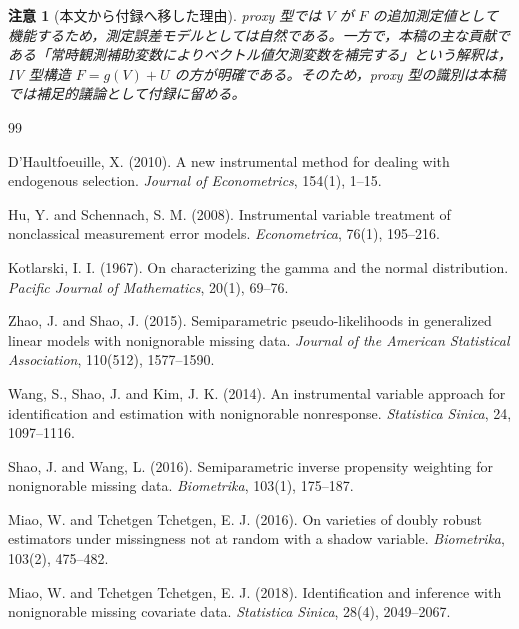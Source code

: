 \documentclass[10pt,a4paper]{article}
\newtheorem{remark}{注意}
\newcommand{\1}{\mathbf{1}}
\begin{document}
\begin{remark}[本文から付録へ移した理由]
proxy 型では $V$ が $F$ の追加測定値として機能するため，測定誤差モデルとしては自然である。一方で，本稿の主な貢献である「常時観測補助変数によりベクトル値欠測変数を補完する」という解釈は，IV 型構造 $F=g(V)+U$ の方が明確である。そのため，proxy 型の識別は本稿では補足的議論として付録に留める。
\end{remark}

\nocite{dHaultfoeuille2010,HuSchennach2008,Kotlarski1967,ZhaoShao2015,KanoTakai2011,WangShaoKim2014,ShaoWang2016,MiaoTchetgen2016,MiaoTchetgen2018,LiMiaoTchetgen2023,Rubin1976,Rubin1987,LittleRubin2002,BlackwellHonakerKing2017a,BlackwellHonakerKing2017b}
\printbibliography[title={References}]

\iffalse
\begin{thebibliography}{99}

D'Haultfoeuille, X. (2010).
A new instrumental method for dealing with endogenous selection.
\textit{Journal of Econometrics}, 154(1), 1--15.

Hu, Y. and Schennach, S. M. (2008).
Instrumental variable treatment of nonclassical measurement error models.
\textit{Econometrica}, 76(1), 195--216.

Kotlarski, I. I. (1967).
On characterizing the gamma and the normal distribution.
\textit{Pacific Journal of Mathematics}, 20(1), 69--76.

Zhao, J. and Shao, J. (2015).
Semiparametric pseudo-likelihoods in generalized linear models with nonignorable missing data.
\textit{Journal of the American Statistical Association}, 110(512), 1577--1590.

Wang, S., Shao, J. and Kim, J. K. (2014).
An instrumental variable approach for identification and estimation with nonignorable nonresponse.
\textit{Statistica Sinica}, 24, 1097--1116.

Shao, J. and Wang, L. (2016).
Semiparametric inverse propensity weighting for nonignorable missing data.
\textit{Biometrika}, 103(1), 175--187.

Miao, W. and Tchetgen Tchetgen, E. J. (2016).
On varieties of doubly robust estimators under missingness not at random with a shadow variable.
\textit{Biometrika}, 103(2), 475--482.

Miao, W. and Tchetgen Tchetgen, E. J. (2018).
Identification and inference with nonignorable missing covariate data.
\textit{Statistica Sinica}, 28(4), 2049--2067.


\end{thebibliography}
\end{document}
